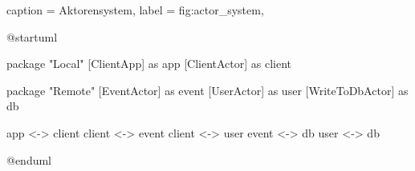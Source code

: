 \begin{dhbwfigure}{%
    caption	= Aktorensystem,
    label	= fig:actor_system,
}
\begin{plantuml}
@startuml

package "Local" {
    [ClientApp] as app
    [ClientActor] as client
}

package "Remote" {
    [EventActor] as event
    [UserActor] as user
    [WriteToDbActor] as db
}

app <-> client
client <-> event
client <-> user
event <-> db
user <-> db

@enduml
\end{plantuml}
\end{dhbwfigure}
